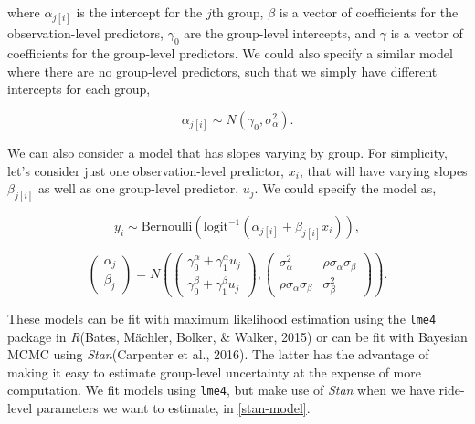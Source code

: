 \documentclass[12pt,twoside]{reedthesis}
\begin{document}
  where \(\alpha_{j[i]}\) is the intercept for the \(j\)th group,
  \(\beta\) is a vector of coefficients for the observation-level
  predictors, \(\gamma_0\) are the group-level intercepts, and \(\gamma\)
  is a vector of coefficients for the group-level predictors. We could
  also specify a similar model where there are no group-level predictors,
  such that we simply have different intercepts for each group,
  
  \begin{equation}
  \alpha_{j[i]} \sim N(\gamma_0, \sigma_{\alpha}^2).
  \end{equation}
  
  We can also consider a model that has slopes varying by group. For
  simplicity, let's consider just one observation-level predictor,
  \(x_i\), that will have varying slopes \(\beta_{j[i]}\) as well as one
  group-level predictor, \(u_j\). We could specify the model as,
  
  \begin{equation}
  y_i \sim \text{Bernoulli} \left( 
  \text{logit}^{-1} (\alpha_{j[i]} + \beta_{j[i]} x_i) \right),
  \end{equation}
  
  \begin{equation}
  \left(
  \begin{array}{c}
  \alpha_{j}\\
  \beta_{j}
  \end{array}
  \right) =
  N \left(
  \left(
  \begin{array}{c}
  \gamma_0^\alpha + \gamma_1^\alpha u_j\\
  \gamma_0^\beta + \gamma_1^\beta u_j
  \end{array}
  \right),
  \left(
  \begin{array}{cc}
  \sigma^2_\alpha & \rho \sigma_\alpha \sigma_\beta\\
  \rho \sigma_\alpha \sigma_\beta & \sigma^2_\beta
  \end{array}
  \right)
  \right).
  \end{equation}
  
  These models can be fit with maximum likelihood estimation using the
  \texttt{lme4} package in \textit{R}(Bates, Mächler, Bolker, \& Walker,
  2015) or can be fit with Bayesian MCMC using \textit{Stan}(Carpenter et
  al., 2016). The latter has the advantage of making it easy to estimate
  group-level uncertainty at the expense of more computation. We fit
  models using \texttt{lme4}, but make use of \textit{Stan} when we have
  ride-level parameters we want to estimate, in \autoref{stan-model}.
  
\end{document}

